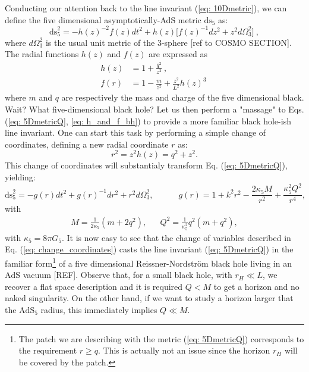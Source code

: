 \documentclass[12pt, a4paper]{article} %
\begin{document}
Conducting our attention back to the line invariant (\ref{eq: 10Dmetric}), we can define the five dimensional asymptotically-AdS metric $\text{ds}_{5}$ as:
\begin{equation}\label{eq: 5DmetricQ}
  \text{ds}_{5}^{2} = - h(z)^{-2} f(z) dt^{2}
        + h(z) \big[ f(z)^{-1} dz^{2} + z^{2} d\Omega_{3}^{2} \big] \ ,
\end{equation}
where $d\Omega_{3}^2$ is the usual unit metric of the 3-sphere [ref to COSMO SECTION]. The radial functions $h(z)$ and $f(z)$ are expressed as
\begin{align}\label{eq: h_and_f_bh}
 h(z)&=1+\frac{q^{2}}{z^{2}} \ , \\
 f(r) &= 1 - \frac{m}{z^{2}} + \frac{z^{2}}{L^{2}} h(z)^{3} \ 
\end{align}
where $m$ and $q$ are respectively the mass and charge of the five dimensional black. Wait? What five-dimensional black hole? Let us then perform a "massage" to Eqs. (\ref{eq: 5DmetricQ}, \ref{eq: h_and_f_bh}) to provide a more familiar black hole-ish line invariant. One can start this task by performing a simple change of coordinates, defining a new radial coordinate $r$ as:
\begin{equation}\label{eq: change_coordinates}
    r^{2} = z^{2}h(z) = q^{2} + z^{2} .
\end{equation}
This change of coordinates will substantialy transform Eq. (\ref{eq: 5DmetricQ}), yielding:
\begin{equation}\label{eq:metricargument}
    \text{ds}_{5}^{2} = -g(r) dt^{2} + g(r)^{-1} dr^{2}+r^{2} d\Omega_{3}^{2}, \qquad \quad g(r) = 1 + k^{2}r^{2}- \frac{2\kappa_{5} M}{r^{2}} + \frac{\kappa_{5}^{2} Q^{2}}{r^{4}}, 
\end{equation}
with 
\begin{align}
    M = \frac{1}{2\kappa_5}\left(m + 2q^2\right), &&  Q^2 = \frac{1}{\kappa_5^2}q^2(m+q^2),
\end{align}
with $\kappa_5 = 8\pi G_5$. It is now easy to see that the change of variables described in Eq. (\ref{eq: change_coordinates}) casts the line invariant (\ref{eq: 5DmetricQ}) in the familiar form\footnote{The patch we are describing with the metric (\ref{eq: 5DmetricQ}) corresponds to the requirement $r\geqslant q$. This is actually not an issue since the  horizon $r_{H}$ will be covered by the patch.} of a five dimensional Reissner-Nordström black hole living in an $\text{AdS}$ vacuum [REF]. Observe that, for a small black hole, with $r_{H} \ll L$, we recover a flat space description and it is required $Q<M$ to get a horizon and no naked singularity. On the other hand, if we want to study a horizon larger that the $\text{AdS}_{5}$ radius, this immediately implies $Q\ll M$.
\end{document}
